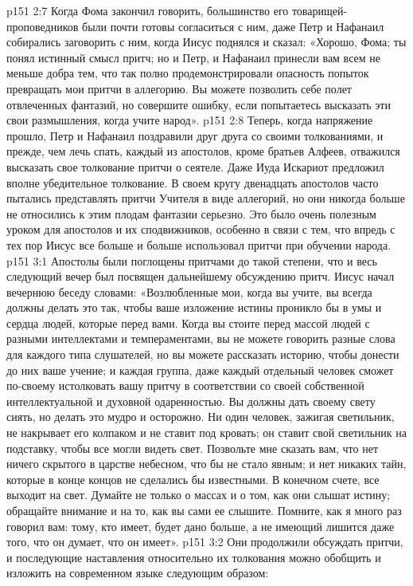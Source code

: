 \vs p151 2:7 Когда Фома закончил говорить, большинство его товарищей\hyp{}проповедников были почти готовы согласиться с ним, даже Петр и Нафанаил собирались заговорить с ним, когда Иисус поднялся и сказал: «Хорошо, Фома; ты понял истинный смысл притч; но и Петр, и Нафанаил принесли вам всем не меньше добра тем, что так полно продемонстрировали опасность попыток превращать мои притчи в аллегорию. Вы можете позволить себе полет отвлеченных фантазий, но совершите ошибку, если попытаетесь высказать эти свои размышления, когда учите народ».
\vs p151 2:8 Теперь, когда напряжение прошло, Петр и Нафанаил поздравили друг друга со своими толкованиями, и прежде, чем лечь спать, каждый из апостолов, кроме братьев Алфеев, отважился высказать свое толкование притчи о сеятеле. Даже Иуда Искариот предложил вполне убедительное толкование. В своем кругу двенадцать апостолов часто пытались представлять притчи Учителя в виде аллегорий, но они никогда больше не относились к этим плодам фантазии серьезно. Это было очень полезным уроком для апостолов и их сподвижников, особенно в связи с тем, что впредь с тех пор Иисус все больше и больше использовал притчи при обучении народа.
\vs p151 3:1 Апостолы были поглощены притчами до такой степени, что и весь следующий вечер был посвящен дальнейшему обсуждению притч. Иисус начал вечернюю беседу словами: «Возлюбленные мои, когда вы учите, вы всегда должны делать это так, чтобы ваше изложение истины проникло бы в умы и сердца людей, которые перед вами. Когда вы стоите перед массой людей с разными интеллектами и темпераментами, вы не можете говорить разные слова для каждого типа слушателей, но вы можете рассказать историю, чтобы донести до них ваше учение; и каждая группа, даже каждый отдельный человек сможет по\hyp{}своему истолковать вашу притчу в соответствии со своей собственной интеллектуальной и духовной одаренностью. Вы должны дать своему свету сиять, но делать это мудро и осторожно. Ни один человек, зажигая светильник, не накрывает его колпаком и не ставит под кровать; он ставит свой светильник на подставку, чтобы все могли видеть свет. Позвольте мне сказать вам, что нет ничего скрытого в царстве небесном, что бы не стало явным; и нет никаких тайн, которые в конце концов не сделались бы известными. В конечном счете, все выходит на свет. Думайте не только о массах и о том, как они слышат истину; обращайте внимание и на то, как вы сами ее слышите. Помните, как я много раз говорил вам: тому, кто имеет, будет дано больше, а не имеющий лишится даже того, что он думает, что он имеет».
\vs p151 3:2 \pc Они продолжили обсуждать притчи, и последующие наставления относительно их толкования можно обобщить и изложить на современном языке следующим образом:

